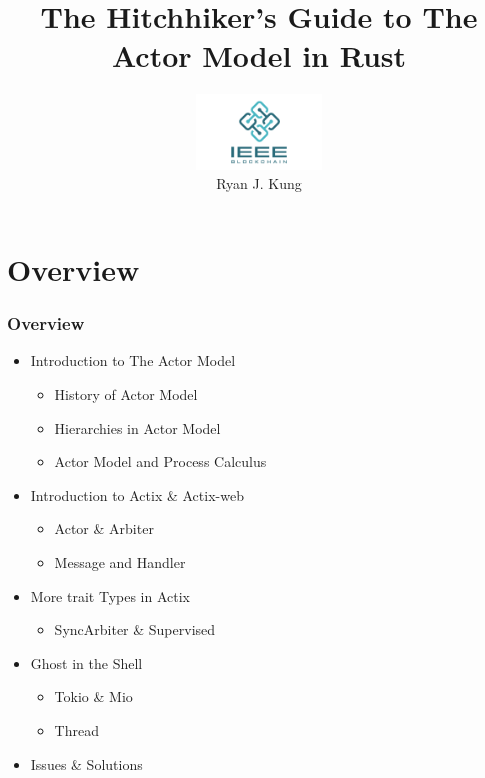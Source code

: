 \documentclass[notheorems, aspectratio=54]{beamer}
\title[Actor Model]{The Hitchhiker's Guide to The Actor Model in Rust}
\author[Ryan Kung]{\includegraphics[height=2cm]{./ieee-blockchain.png} \\ Ryan J. Kung}
\institute[IEEE Blockchain]{ryankung@ieee.org}
\begin{document}
\begin{frame}
    \titlepage
\end{frame}

\section{Overview}

\begin{frame}
  \frametitle{Overview}
  \begin{itemize}
  \item Introduction to The Actor Model
     \begin{itemize}
     \item History of Actor Model
     \item Hierarchies in Actor Model
     \item Actor Model and Process Calculus
     \end{itemize}
   \item Introduction to Actix \& Actix-web
     \begin{itemize}
     \item Actor \& Arbiter
     \item Message and Handler
    \end{itemize}
    \item More trait Types in Actix
    \begin{itemize}
      \item SyncArbiter \& Supervised
    \end{itemize}
    \item Ghost in the Shell
    \begin{itemize}
      \item Tokio \& Mio
      \item Thread
    \end{itemize}
  \item Issues \& Solutions
\end{itemize}
\end{frame}
\end{document}

